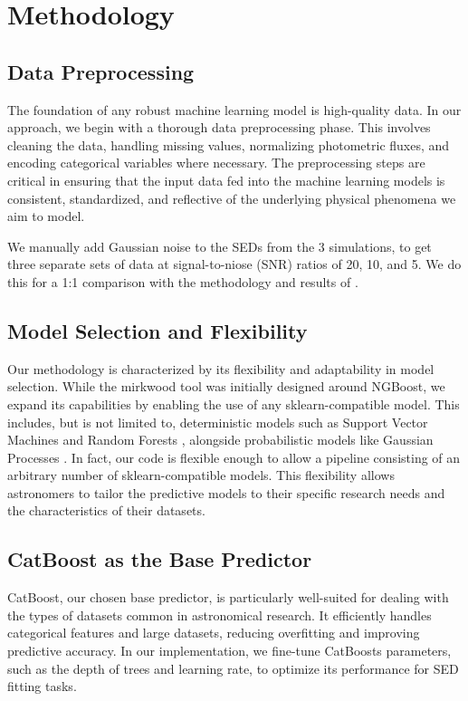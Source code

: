 \documentclass[letterpaper]{article}
\begin{document}
\section{Methodology}
\subsection{Data Preprocessing}
The foundation of any robust machine learning model is high-quality data. In our approach, we begin with a thorough data preprocessing phase. This involves cleaning the data, handling missing values, normalizing photometric fluxes, and encoding categorical variables where necessary. The preprocessing steps are critical in ensuring that the input data fed into the machine learning models is consistent, standardized, and reflective of the underlying physical phenomena we aim to model.

We manually add Gaussian noise to the SEDs from the 3 simulations, to get three separate sets of data at signal-to-niose (SNR) ratios of 20, 10, and 5. We do this for a 1:1 comparison with the methodology and results of \citet{Gilda21}.

\subsection{Model Selection and Flexibility}
Our methodology is characterized by its flexibility and adaptability in model selection. While the mirkwood tool was initially designed around NGBoost, we expand its capabilities by enabling the use of any sklearn-compatible model. This includes, but is not limited to, deterministic models such as Support Vector Machines \cite{soentpiet1999advances} and Random Forests \cite{randomforests}, alongside probabilistic models like Gaussian Processes \cite{gaussian_processes}. In fact, our code is flexible enough to allow a pipeline consisting of an arbitrary number of sklearn-compatible models. This flexibility allows astronomers to tailor the predictive models to their specific research needs and the characteristics of their datasets.

\subsection{CatBoost as the Base Predictor}
CatBoost, our chosen base predictor, is particularly well-suited for dealing with the types of datasets common in astronomical research. It efficiently handles categorical features and large datasets, reducing overfitting and improving predictive accuracy. In our implementation, we fine-tune CatBoosts parameters, such as the depth of trees and learning rate, to optimize its performance for SED fitting tasks.
\end{document}
